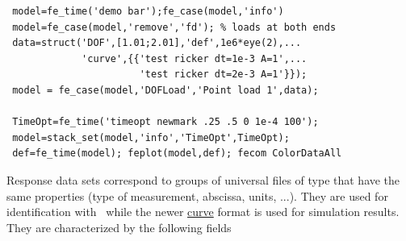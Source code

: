\begin{verbatim}
 model=fe_time('demo bar');fe_case(model,'info')
 model=fe_case(model,'remove','fd'); % loads at both ends
 data=struct('DOF',[1.01;2.01],'def',1e6*eye(2),...
             'curve',{{'test ricker dt=1e-3 A=1',...
                       'test ricker dt=2e-3 A=1'}});
 model = fe_case(model,'DOFLoad','Point load 1',data);

 TimeOpt=fe_time('timeopt newmark .25 .5 0 1e-4 100');
 model=stack_set(model,'info','TimeOpt',TimeOpt);
 def=fe_time(model); feplot(model,def); fecom ColorDataAll
\end{verbatim}%

%


Response data sets  correspond to groups of universal files of type  that have the same properties (type of measurement, abscissa, units, ...). They are used for identification with \idcom\ while the newer \hyperlink{curve}{curve} format is used for simulation results. They are characterized by the following fields

